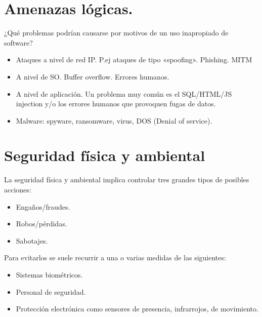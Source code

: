 \documentclass[letterpaper,10pt,spanish]{sphinxmanual}
\begin{document}
\section{Amenazas lógicas.}
\label{\detokenize{tema_pautas_seguridad_informatica/tema_pautas_seguridad_informatica:amenazas-logicas}}
¿Qué problemas podrían causarse por motivos de un uso inapropiado de software?
\begin{itemize}
\item {} 
Ataques a nivel de red IP. P.ej ataques de tipo «spoofing». Phishing. MITM

\item {} 
A nivel de SO. Buffer overflow. Errores humanos.

\item {} 
A nivel de aplicación. Un problema muy común es el SQL/HTML/JS injection y/o los errores humanos que provoquen fugas de datos.

\item {} 
Malware: spyware, ransomware, virus, DOS (Denial of service).

\end{itemize}


\section{Seguridad física y ambiental}
\label{\detokenize{tema_pautas_seguridad_informatica/tema_pautas_seguridad_informatica:seguridad-fisica-y-ambiental}}
La seguridad física y ambiental implica controlar tres grandes tipos de posibles acciones:
\begin{itemize}
\item {} 
Engaños/fraudes.

\item {} 
Robos/pérdidas.

\item {} 
Sabotajes.

\end{itemize}

Para evitarlos se suele recurrir a una o varias medidas de las siguientes:
\begin{itemize}
\item {} 
Sistemas biométricos.

\item {} 
Personal de seguridad.

\item {} 
Protección electrónica como sensores de presencia, infrarrojos, de movimiento.

\end{itemize}
\end{document}
